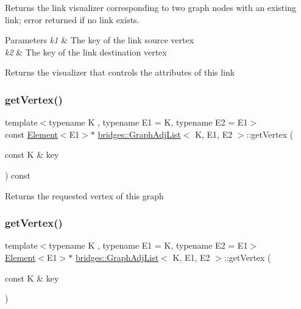 Returns the link visualizer corresponding to two graph nodes with an existing link; error returned if no link exists.


\begin{DoxyParams}{Parameters}
{\em k1} & The key of the link source vertex \\
\hline
{\em k2} & The key of the link destination vertex\\
\hline
\end{DoxyParams}
\begin{DoxyReturn}{Returns}
the visualizer that controls the attributes of this link 
\end{DoxyReturn}
\mbox{\label{classbridges_1_1_graph_adj_list_a9a222bfc1d37f459caac60508b816fb6}} 
\subsubsection{\texorpdfstring{get\+Vertex()}{getVertex()}\hspace{0.1cm}{\footnotesize\ttfamily [1/2]}}
{\footnotesize\ttfamily template$<$typename K , typename E1  = K, typename E2  = E1$>$ \\
const \mbox{\hyperlink{classbridges_1_1_element}{Element}}$<$E1$>$$\ast$ \mbox{\hyperlink{classbridges_1_1_graph_adj_list}{bridges\+::\+Graph\+Adj\+List}}$<$ K, E1, E2 $>$\+::get\+Vertex (\begin{DoxyParamCaption}\item[{const K \&}]{key }\end{DoxyParamCaption}) const\hspace{0.3cm}{\ttfamily [inline]}}

\begin{DoxyReturn}{Returns}
the requested vertex of this graph 
\end{DoxyReturn}
\mbox{\label{classbridges_1_1_graph_adj_list_a8ba3aefe8e118ce8d8d6fab807e494c1}} 
\subsubsection{\texorpdfstring{get\+Vertex()}{getVertex()}\hspace{0.1cm}{\footnotesize\ttfamily [2/2]}}
{\footnotesize\ttfamily template$<$typename K , typename E1  = K, typename E2  = E1$>$ \\
\mbox{\hyperlink{classbridges_1_1_element}{Element}}$<$E1$>$$\ast$ \mbox{\hyperlink{classbridges_1_1_graph_adj_list}{bridges\+::\+Graph\+Adj\+List}}$<$ K, E1, E2 $>$\+::get\+Vertex (\begin{DoxyParamCaption}\item[{const K \&}]{key }\end{DoxyParamCaption})\hspace{0.3cm}{\ttfamily [inline]}}

